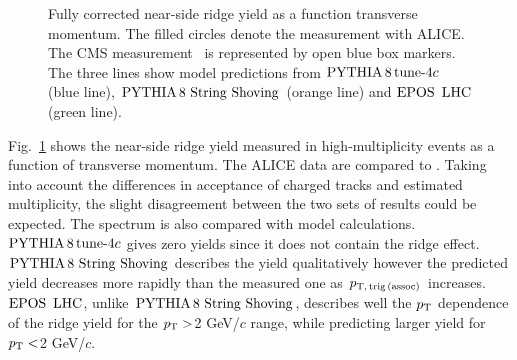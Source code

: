 \begin{figure}[h!]
	\centering
	\caption{ Fully corrected near-side ridge yield as a function transverse momentum. The filled circles denote the measurement with ALICE. The CMS measurement~\cite{Khachatryan:2015lva} is represented by open blue box markers. The three lines show model predictions from $\mathrm{PYTHIA}\,8\,\mathrm{tune}{\text -}4c$ (blue line), ${\mathrm{PYTHIA}\,8~\mathrm{String}~}\mathrm{Shoving}$ (orange line) and ${\mathrm{EPOS}\,~\mathrm{LHC}}$ (green line).}
	\label{fig:PlotYSpect}
\end{figure}

Fig.~\ref{fig:PlotYSpect} shows the near-side ridge yield measured in high-multiplicity events as a function of transverse momentum. The ALICE data are compared to \cite{Khachatryan:2015lva}.
Taking into account the differences in acceptance of charged tracks and estimated multiplicity, the slight disagreement between the two sets of results could be expected. The spectrum is also compared with model calculations. $\mathrm{PYTHIA}\,8\,\mathrm{tune}{\text -}4c$ gives zero yields since it does not contain the ridge effect. ${\mathrm{PYTHIA}\,8~\mathrm{String}~}\mathrm{Shoving}$ describes the yield qualitatively however the predicted yield decreases more rapidly than the measured one as $p_\mathrm{T,\,trig\,(assoc)}$ increases. ${\mathrm{EPOS}\,~\mathrm{LHC}}$, unlike ${\mathrm{PYTHIA}\,8~\mathrm{String}~}\mathrm{Shoving}$, describes well the $p_\mathrm{T}$ dependence of the ridge yield for the $\it{p}_{\rm{T}}>$2 GeV/$c$ range, while predicting larger yield for $\it{p}_{\rm{T}}<$2 GeV/$c$.

